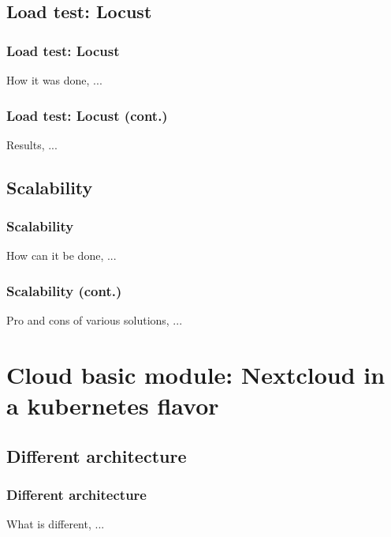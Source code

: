 \documentclass{beamer}
\begin{document}
\subsection{Load test: Locust}
\begin{frame}
    \frametitle{Load test: Locust}
    How it was done, ...
\end{frame}

\begin{frame}
    \frametitle{Load test: Locust (cont.)}
    Results, ...
\end{frame}

\subsection{Scalability}
\begin{frame}
    \frametitle{Scalability}
    How can it be done, ...
\end{frame}

\begin{frame}
    \frametitle{Scalability (cont.)}
    Pro and cons of various solutions, ...
\end{frame}


\section{Cloud \textbf{basic} module: Nextcloud in a kubernetes flavor}

\subsection{Different architecture}
\begin{frame}
    \frametitle{Different architecture}
    What is different, ...
\end{frame}
\end{document}
